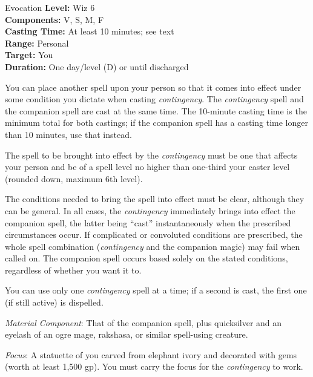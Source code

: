 {Evocation}
{
	\textbf{Level:}
	Wiz 6\\
	\textbf{Components:}
	V, S, M, F\\
	\textbf{Casting Time:}
	At least 10 minutes; see text\\
	\textbf{Range:}
	Personal\\
	\textbf{Target:}
	You\\
	\textbf{Duration:}
	One day/level (D) or until discharged\\
}
{
	You can place another spell upon your person so that it comes into effect under some condition you dictate when casting \emph{contingency}. The \emph{contingency} spell and the companion spell are cast at the same time. The 10-minute casting time is the minimum total for both castings; if the companion spell has a casting time longer than 10 minutes, use that instead.

	The spell to be brought into effect by the \emph{contingency} must be one that affects your person and be of a spell level no higher than one-third your caster level (rounded down, maximum 6th level).

	The conditions needed to bring the spell into effect must be clear, although they can be general. In all cases, the \emph{contingency} immediately brings into effect the companion spell, the latter being ``cast'' instantaneously when the prescribed circumstances occur. If complicated or convoluted conditions are prescribed, the whole spell combination (\emph{contingency} and the companion magic) may fail when called on. The companion spell occurs based solely on the stated conditions, regardless of whether you want it to.

	You can use only one \emph{contingency} spell at a time; if a second is cast, the first one (if still active) is dispelled.

	\textit{Material Component}:
	That of the companion spell, plus quicksilver and an eyelash of an ogre mage, rakshasa, or similar spell-using creature.

	\textit{Focus}:
	A statuette of you carved from elephant ivory and decorated with gems (worth at least 1,500 gp). You must carry the focus for the \emph{contingency} to work.

}

